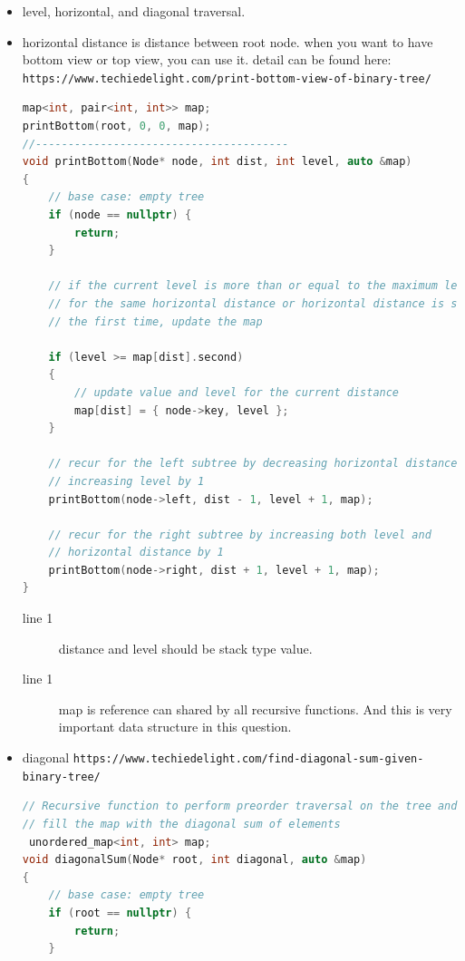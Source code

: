 \documentclass[a4paper,11pt,twoside]{book}
\begin{document}
\begin{itemize}
	\item level, horizontal, and diagonal traversal.
	
	\item horizontal distance is distance between root node.  when you want to have bottom view or top view, you can use it.  detail can be found here: \newline
	\verb|https://www.techiedelight.com/print-bottom-view-of-binary-tree/|
	
\begin{lstlisting}[frame=single, language=c++]
map<int, pair<int, int>> map;
printBottom(root, 0, 0, map);
//---------------------------------------	
void printBottom(Node* node, int dist, int level, auto &map)
{
	// base case: empty tree
	if (node == nullptr) {
		return;
	}
	
	// if the current level is more than or equal to the maximum level seen so far
	// for the same horizontal distance or horizontal distance is seen for
	// the first time, update the map
	
	if (level >= map[dist].second)
	{
		// update value and level for the current distance
		map[dist] = { node->key, level };
	}
	
	// recur for the left subtree by decreasing horizontal distance and
	// increasing level by 1
	printBottom(node->left, dist - 1, level + 1, map);
	
	// recur for the right subtree by increasing both level and
	// horizontal distance by 1
	printBottom(node->right, dist + 1, level + 1, map);
}
\end{lstlisting}
\begin{description}
	\item[line 1] distance and level should be stack type value.
	\item[line 1] map is reference can shared by all recursive functions. And this is very important data structure in this question. 
\end{description}

	\item diagonal  \verb|https://www.techiedelight.com/find-diagonal-sum-given-binary-tree/|
\begin{lstlisting}[frame=single, language=c++]
// Recursive function to perform preorder traversal on the tree and
// fill the map with the diagonal sum of elements
 unordered_map<int, int> map;
void diagonalSum(Node* root, int diagonal, auto &map)
{
	// base case: empty tree
	if (root == nullptr) {
		return;
	}
	

\end{lstlisting}
\end{itemize}
\end{document}
